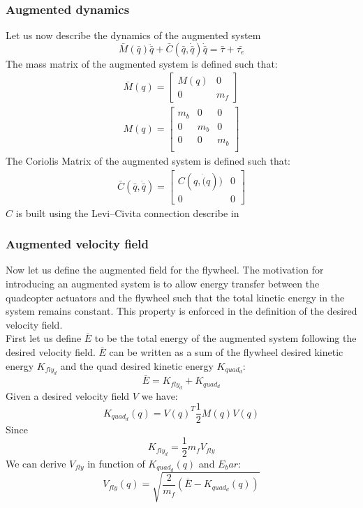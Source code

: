 \subsubsection{Augmented dynamics}
Let us now describe the dynamics of the augmented system
\begin{equation} 
    \bar{M}(\bar{q})\ddot{\bar{q}} + \bar{C}(\bar{q}, \dot{\bar{q}})\dot{\bar{q}} = \bar{\tau} + \bar{\tau_{e}}
\end{equation}
The mass matrix of the augmented system is defined such that:
\begin{align}
\bar{M}(q) = \begin{bmatrix} 
   M(q) & 0 \\
    0 & m_f
\end{bmatrix}\\
M(q) =  \begin{bmatrix} 
    m_b & 0 & 0 \\
    0 & m_b & 0 \\
    0 & 0 & m_b \\
 \end{bmatrix}
\end{align}
The Coriolis Matrix of the augmented system is defined such that: 
\begin{align}
\bar{C}(\bar{q}, \dot{\bar{q}}) = \begin{bmatrix} 
    C(q, \dot(q)) & 0 \\
    0 & 0 
\end{bmatrix}
\end{align}
$C$ is built using the Levi–Civita connection describe in \cite{li2001passive}
\subsubsection{Augmented velocity field}
Now let us define the augmented field for the flywheel. The motivation for introducing an augmented system is
to allow energy transfer between the quadcopter actuators and the flywheel such that the total kinetic energy in the system remains constant.
This property is enforced in the definition of the desired velocity field. \\
First let us define $\bar{E}$ to be the total energy of the augmented system following the desired velocity field.
$\bar{E}$ can be written as a sum of the flywheel desired kinetic energy $K_{fly_{d}}$ and the quad desired kinetic energy $K_{quad_{d}}$: 
\begin{equation}
    \bar{E} = K_{fly_{d}} + K_{quad_{d}}
\end{equation}
Given a desired velocity field $V$ we have: 
\begin{equation}
    K_{quad_{d}}(q) = V(q)^T\frac{1}{2}M(q)V(q)
\end{equation}
Since 
\begin{equation}
    K_{fly_{d}} = \frac{1}{2} m_f V_{fly}
\end{equation}
We can derive $V_{fly}$ in function of  $K_{quad_{d}}(q)$ and $E_bar$:
\begin{equation}
    V_{fly}(q) = \sqrt{\frac{2}{m_f}(\bar{E}- K_{quad_{d}}(q))}
\end{equation}
